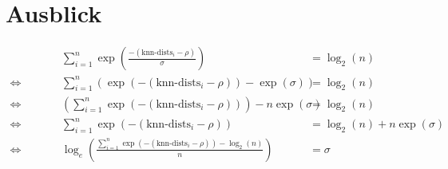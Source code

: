 
\chapter{Ausblick} 

\label{Ausblick}









\begin{align*}
	&\qquad&
	\sum_{i=1}^n \exp\left(\frac{-(\text{knn-dists}_i - \rho)}{\sigma}\right) &= \log_2(n)	\\
	\iff&& \sum_{i=1}^n (\exp(-(\text{knn-dists}_i - \rho)) - \exp(\sigma)) &= \log_2(n) \\
	\iff&& \left(\sum_{i=1}^n \exp(-(\text{knn-dists}_i - \rho))\right) - n\exp(\sigma) &= \log_2(n) \\
	\iff&& \sum_{i=1}^n \exp(-(\text{knn-dists}_i - \rho)) &= \log_2(n) + n\exp(\sigma) \\
	\iff&& \log_e \left(\frac{\sum_{i=1}^n \exp(-(\text{knn-dists}_i - \rho)) - \log_2(n)}{n}\right) &= \sigma \\
\end{align*}
